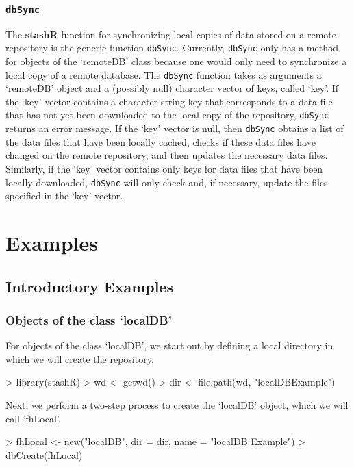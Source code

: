 \documentclass{article}
\newcommand{\pkg}{\textbf}
\newcommand{\code}{\texttt}
\begin{document}
\subsubsection{\code{dbSync}}\label{synch-interface}
The \pkg{stashR} function for synchronizing local copies
of data stored on a remote repository is the generic function
\code{dbSync}. Currently, \code{dbSync} only has a method for
objects of the `remoteDB' class because one would only need
to synchronize a local copy of a remote database. The
\code{dbSync} function takes as arguments a `remoteDB'
object and a (possibly null) character vector of keys, called
`key'. If the `key' vector contains a character string key that
corresponds to a data file that has not yet been downloaded to the
local copy of the repository, \code{dbSync} returns an error
message. If the `key' vector is null, then \code{dbSync} obtains a
list of the data files that have been locally cached, checks if
these data files have changed on the remote repository, and then
updates the necessary data files. Similarly, if the `key' vector
contains only keys for data files that have been locally
downloaded, \code{dbSync} will only check and, if necessary,
update the files specified in the `key' vector.


\section{Examples}

\subsection{Introductory Examples}

\subsubsection{Objects of the class `localDB'} 

For objects of the class `localDB', we start out by 
defining a local directory in which we will create the 
repository.

\begin{Schunk}
\begin{Sinput}
> library(stashR)
> wd <- getwd()
> dir <- file.path(wd, "localDBExample")
\end{Sinput}
\end{Schunk}

\noindent Next, we perform a two-step process to create the `localDB' object, 
which we will call `fhLocal'.
\begin{Schunk}
\begin{Sinput}
> fhLocal <- new("localDB", dir = dir, name = "localDB Example")
> dbCreate(fhLocal)
\end{Sinput}
\end{Schunk}
\end{document}
